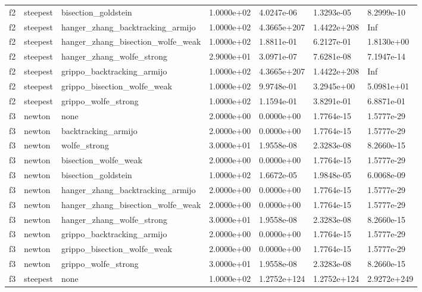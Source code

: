 \documentclass[a4paper,11pt]{article}
\numberwithin{equation}{section} %
\begin{document}
\begin{longtable}{p{1.5cm}|p{1.5cm}|p{4cm}|p{2cm}|p{2cm}|p{2cm}|p{2cm}}
        f2 & steepest & bisection\_goldstein & 1.0000e+02 & 4.0247e-06 & 1.3293e-05 & 8.2999e-10 \\
        f2 & steepest & hanger\_zhang\_backtracking\_armijo & 1.0000e+02 & 4.3665e+207 & 1.4422e+208 & Inf \\
        f2 & steepest & hanger\_zhang\_bisection\_wolfe\_weak & 1.0000e+02 & 1.8811e-01 & 6.2127e-01 & 1.8130e+00 \\
        f2 & steepest & hanger\_zhang\_wolfe\_strong & 2.9000e+01 & 3.0971e-07 & 7.6281e-08 & 7.1947e-14 \\
        f2 & steepest & grippo\_backtracking\_armijo & 1.0000e+02 & 4.3665e+207 & 1.4422e+208 & Inf \\
        f2 & steepest & grippo\_bisection\_wolfe\_weak & 1.0000e+02 & 9.9748e-01 & 3.2945e+00 & 5.0981e+01 \\
        f2 & steepest & grippo\_wolfe\_strong & 1.0000e+02 & 1.1594e-01 & 3.8291e-01 & 6.8871e-01 \\
        f3 & newton & none & 2.0000e+00 & 0.0000e+00 & 1.7764e-15 & 1.5777e-29 \\
        f3 & newton & backtracking\_armijo & 2.0000e+00 & 0.0000e+00 & 1.7764e-15 & 1.5777e-29 \\
        f3 & newton & wolfe\_strong & 3.0000e+01 & 1.9558e-08 & 2.3283e-08 & 8.2660e-15 \\
        f3 & newton & bisection\_wolfe\_weak & 2.0000e+00 & 0.0000e+00 & 1.7764e-15 & 1.5777e-29 \\
        f3 & newton & bisection\_goldstein & 1.0000e+02 & 1.6672e-05 & 1.9848e-05 & 6.0068e-09 \\
        f3 & newton & hanger\_zhang\_backtracking\_armijo & 2.0000e+00 & 0.0000e+00 & 1.7764e-15 & 1.5777e-29 \\
        f3 & newton & hanger\_zhang\_bisection\_wolfe\_weak & 2.0000e+00 & 0.0000e+00 & 1.7764e-15 & 1.5777e-29 \\
        f3 & newton & hanger\_zhang\_wolfe\_strong & 3.0000e+01 & 1.9558e-08 & 2.3283e-08 & 8.2660e-15 \\
        f3 & newton & grippo\_backtracking\_armijo & 2.0000e+00 & 0.0000e+00 & 1.7764e-15 & 1.5777e-29 \\
        f3 & newton & grippo\_bisection\_wolfe\_weak & 2.0000e+00 & 0.0000e+00 & 1.7764e-15 & 1.5777e-29 \\
        f3 & newton & grippo\_wolfe\_strong & 3.0000e+01 & 1.9558e-08 & 2.3283e-08 & 8.2660e-15 \\
        f3 & steepest & none & 1.0000e+02 & 1.2752e+124 & 1.2752e+124 & 2.9272e+249 \\

\end{longtable}
\end{document}
